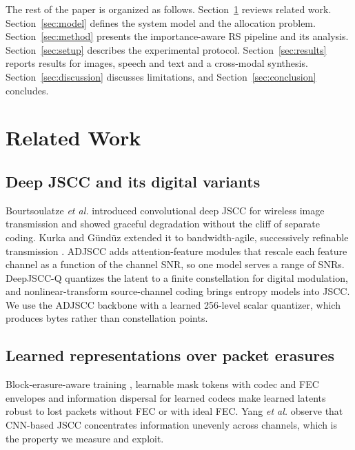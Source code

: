 \documentclass[journal]{IEEEtran}
\begin{document}
The rest of the paper is organized as follows. Section~\ref{sec:related} reviews related work.
Section~\ref{sec:model} defines the system model and the allocation problem. Section~\ref{sec:method}
presents the importance-aware RS pipeline and its analysis. Section~\ref{sec:setup} describes the
experimental protocol. Section~\ref{sec:results} reports results for images, speech and text and a
cross-modal synthesis. Section~\ref{sec:discussion} discusses limitations, and Section~\ref{sec:conclusion}
concludes.

\section{Related Work}\label{sec:related}
\subsection{Deep JSCC and its digital variants}
Bourtsoulatze \emph{et al.} \cite{bourtsoulatze2019deep} introduced convolutional deep JSCC for wireless
image transmission and showed graceful degradation without the cliff of separate coding. Kurka and
G\"und\"uz extended it to bandwidth-agile, successively refinable transmission \cite{kurka2021bandwidth}.
ADJSCC \cite{xu2022adjscc} adds attention-feature modules that rescale each feature channel as a function
of the channel SNR, so one model serves a range of SNRs. DeepJSCC-Q \cite{tung2022deepjsccq} quantizes the
latent to a finite constellation for digital modulation, and nonlinear-transform source-channel coding
\cite{dai2022ntscc} brings entropy models into JSCC. We use the ADJSCC backbone with a learned 256-level
scalar quantizer, which produces bytes rather than constellation points.

\subsection{Learned representations over packet erasures}
Block-erasure-aware training \cite{esfahanizadeh2026block}, learnable mask tokens with codec and FEC
envelopes \cite{bo2026lgsemcom} and information dispersal for learned codecs \cite{wei2026everypacket}
make learned latents robust to lost packets without FEC or with ideal FEC. Yang \emph{et al.}
\cite{yang2025partitioning} observe that CNN-based JSCC concentrates information unevenly across
channels, which is the property we measure and exploit.
\end{document}
